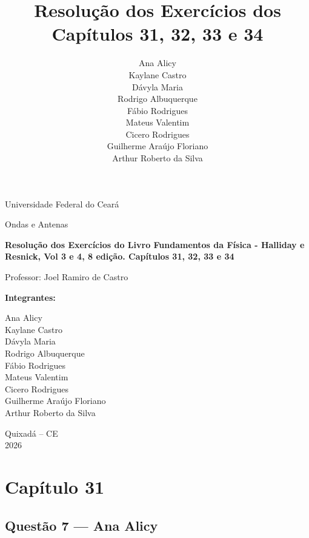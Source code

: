 \documentclass[12pt,a4paper]{article}
\title{\textbf{Resolução dos Exercícios dos Capítulos 31, 32, 33 e 34}}
\author{
Ana Alicy \\
Kaylane Castro \\
Dávyla Maria \\
Rodrigo Albuquerque \\
Fábio Rodrigues \\
Mateus Valentim \\
Cicero Rodrigues \\
Guilherme Araújo Floriano \\
Arthur Roberto da Silva
}
\date{}
\begin{document}

\begin{titlepage}
    \centering

    {\Large Universidade Federal do Ceará \par}
    \vspace{1.5cm}

    {\Large Ondas e Antenas \par}
    \vspace{1.5cm}

    {\huge \textbf{Resolução dos Exercícios do Livro Fundamentos da Física - Halliday e Resnick, Vol 3 e 4, 8 edição. Capítulos 31, 32, 33 e 34} \par}
    \vspace{2cm}

    {\Large Professor: Joel Ramiro de Castro \par}
    \vspace{2cm}

    \textbf{Integrantes:}

    \vspace{0.5cm}

    \begin{flushleft}
    Ana Alicy \\
    Kaylane Castro \\
    Dávyla Maria \\
    Rodrigo Albuquerque \\
    Fábio Rodrigues \\
    Mateus Valentim \\
    Cicero Rodrigues \\
    Guilherme Araújo Floriano \\
    Arthur Roberto da Silva
    \end{flushleft}

    \vfill

    {\large Quixadá -- CE \\
    2026}

\end{titlepage}

\tableofcontents
\newpage



\section{Capítulo 31}

\subsection{Questão 7 — Ana Alicy}
\end{document}
